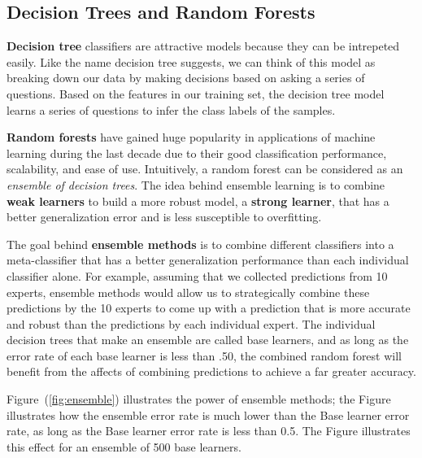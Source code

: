 \documentclass[a4paper,11pt]{article}
\newcommand{\codewhite}[1]{\colorbox{white}{\texttt{#1}}}
\begin{document}





\subsection{Decision Trees and Random Forests}

\textbf{Decision tree} classifiers are attractive models because they can be intrepeted easily. Like the name decision tree suggests, we can think of this model as breaking down our data by making decisions based on asking a series of questions.
Based on the features in our training set, the decision tree model learns a series of questions to infer the class labels of the samples. 

\textbf{Random forests} have gained huge popularity in applications of machine learning during the last decade due to their good classification performance, scalability, and ease of use. Intuitively, a random forest can be considered as an \textit{ensemble of decision trees}. The idea behind ensemble learning is to combine \textbf{weak learners} to build a more robust model, a \textbf{strong learner}, that has a better generalization error and is less susceptible to overfitting. 

The goal behind \textbf{ensemble methods} is to combine different classifiers into a meta-classifier that has a better generalization performance than each individual classifier alone. For example, assuming that we collected predictions from 10 experts, ensemble methods would allow us to strategically combine these predictions by the 10 experts to come up with a prediction that is more accurate and robust than the predictions by each individual expert. The individual decision trees that make an ensemble are called base learners, and as long as the error rate of each base learner is less than .50, the combined random forest will benefit from the affects of combining predictions to achieve a far greater accuracy.



Figure~(\ref{fig:ensemble}) illustrates the power of ensemble methods; the Figure illustrates how the ensemble error rate is much lower than the Base learner error rate, as long as the Base learner error rate is less than 0.5. The Figure illustrates this effect for an ensemble of 500 base learners.
\end{document}
